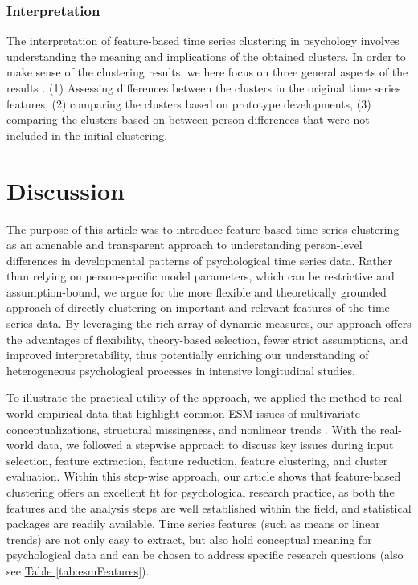 \documentclass[man, 12pt, a4paper, mask, floatsintext]{apa7}
\theoremstyle{break}
\theoremstyle{plain}
\newcommand{\tblref}[2][]{\hyperref[#2]{Table \ref*{#2}#1}}
\begin{document}


\subsubsection{Interpretation}
The interpretation of feature-based time series clustering in psychology involves understanding the meaning and implications of the obtained clusters. In order to make sense of the clustering results, we here focus on three general aspects of the results \citep{kaufman1990}. (1) Assessing differences between the clusters in the original time series features, (2) comparing the clusters based on prototype developments, (3) comparing the clusters based on between-person differences that were not included in the initial clustering.



\newpage
\section{Discussion}
The purpose of this article was to introduce feature-based time series clustering as an amenable and transparent approach to understanding person-level differences in developmental patterns of psychological time series data. Rather than relying on person-specific model parameters, which can be restrictive and assumption-bound, we argue for the more flexible and theoretically grounded approach of directly clustering on important and relevant features of the time series data. By leveraging the rich array of dynamic measures, our approach offers the advantages of flexibility, theory-based selection, fewer strict assumptions, and improved interpretability, thus potentially enriching our understanding of heterogeneous psychological processes in intensive longitudinal studies.

To illustrate the practical utility of the approach, we applied the method to real-world empirical data that highlight common ESM issues of multivariate conceptualizations, structural missingness, and nonlinear trends \citep[e.g.,][]{ariens2020}. With the real-world data, we followed a stepwise approach to discuss key issues during input selection, feature extraction, feature reduction, feature clustering, and cluster evaluation. Within this step-wise approach, our article shows that feature-based clustering offers an excellent fit for psychological research practice, as both the features and the analysis steps are well established within the field, and statistical packages are readily available. Time series features (such as means or linear trends) are not only easy to extract, but also hold conceptual meaning for psychological data and can be chosen to address specific research questions (also see \tblref{tab:esmFeatures}).
\end{document}
